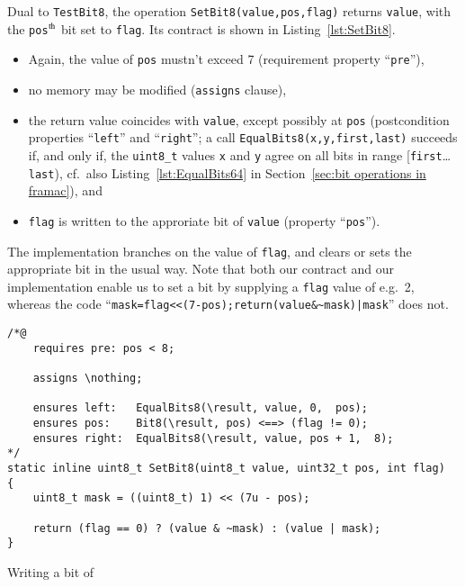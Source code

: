 Dual to \lstinline{TestBit8}, the operation
\lstinline{SetBit8(value,pos,flag)}
returns \lstinline{value}, 
with the \lstinline{pos}$^{\mbox{\scriptsize th}}$ bit
set to \lstinline{flag}.
%
Its contract is shown in Listing~\ref{lst:SetBit8}.
%
\begin{itemize}
\item Again, the value of \lstinline{pos} mustn't exceed 7 
	(requirement property ``\lstinline{pre}''),
\item no memory may be modified (\lstinline{assigns} clause),
\item the return value coincides with \lstinline{value}, except possibly
	at \lstinline{pos} (postcondition properties ``\lstinline{left}'' 
	and ``\lstinline{right}''; a call
	\lstinline{EqualBits8(x,y,first,last)} succeeds if, and
	only if, the \lstinline{uint8_t} values \lstinline{x} and
	\lstinline{y} agree on all bits in range
	[\lstinline{first}\ldots\lstinline{last}), cf.\ also
	Listing~\ref{lst:EqualBits64} in 
	Section~\ref{sec:bit operations in framac}), and 
\item \lstinline{flag} is written to the approriate bit of 
	\lstinline{value} (property ``\lstinline{pos}'').
\end{itemize}
%
The implementation branches on the value of \lstinline{flag}, and
clears or sets the
appropriate bit in the usual way.
%
Note that both our contract and our implementation enable us to set
a bit by supplying a
\lstinline{flag} value of e.g.\ 2, whereas the code 
``\lstinline{mask=flag<<(7-pos);return(value&~mask)|mask}'' does not.





\begin{listing}[hbt]
\begin{minipage}{0.99\textwidth}
\begin{lstlisting}[style=acsl-block]
/*@
    requires pre: pos < 8;

    assigns \nothing;

    ensures left:   EqualBits8(\result, value, 0,  pos);
    ensures pos:    Bit8(\result, pos) <==> (flag != 0);
    ensures right:  EqualBits8(\result, value, pos + 1,  8);
*/
static inline uint8_t SetBit8(uint8_t value, uint32_t pos, int flag)
{
    uint8_t mask = ((uint8_t) 1) << (7u - pos);

    return (flag == 0) ? (value & ~mask) : (value | mask);
}
\end{lstlisting}
\end{minipage}
\caption{\label{lst:SetBit8}Writing a bit of }
\end{listing}





















